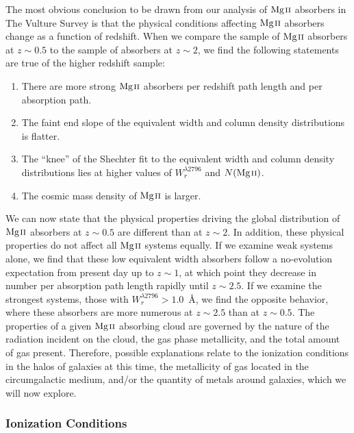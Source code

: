 The most obvious conclusion to be drawn from our analysis of ${\hbox{{\rm Mg}\kern 0.1em{\sc ii}}}$ absorbers in The Vulture Survey is that the physical conditions affecting ${\hbox{{\rm Mg}\kern 0.1em{\sc ii}}}$ absorbers change as a function of redshift. When we compare the sample of ${\hbox{{\rm Mg}\kern 0.1em{\sc ii}}}$ absorbers at $z \sim 0.5$ to the sample of absorbers at $z \sim 2$, we find the following statements are true of the higher redshift sample:

\begin{enumerate}
\item There are more strong ${\hbox{{\rm Mg}\kern 0.1em{\sc ii}}}$ absorbers per redshift path length and per absorption path.
\item The faint end slope of the equivalent width and column density distributions is flatter.
\item The ``knee'' of the Shechter fit to the equivalent width and column density distributions lies at higher values of $W_r^{\lambda2796}$ and $N(\hbox{{\rm Mg}\kern 0.1em{\sc ii}})$.
\item The cosmic mass density of ${\hbox{{\rm Mg}\kern 0.1em{\sc ii}}}$ is larger.
\end{enumerate}

\noindent We can now state that the physical properties driving the global distribution of ${\hbox{{\rm Mg}\kern 0.1em{\sc ii}}}$ absorbers at $z \sim 0.5$ are different than at $z \sim 2$. In addition, these physical properties do not affect all ${\hbox{{\rm Mg}\kern 0.1em{\sc ii}}}$ systems equally. If we examine weak systems alone, we find that these low equivalent width absorbers follow a no-evolution expectation from present day up to $z \sim 1$, at which point they decrease in number per absorption path length rapidly until $z \sim 2.5$. If we examine the strongest systems, those with $W_r^{\lambda2796} > 1.0$~{\AA}, we find the opposite behavior, where these absorbers are more numerous at $z \sim 2.5$ than at $z \sim 0.5$. The properties of a given ${\hbox{{\rm Mg}\kern 0.1em{\sc ii}}}$ absorbing cloud are governed by the nature of the radiation incident on the cloud, the gas phase metallicity, and the total amount of gas present. Therefore, possible explanations relate to the ionization conditions in the halos of galaxies at this time, the metallicity of gas located in the circumgalactic medium, and/or the quantity of metals around galaxies, which we will now explore.


\subsubsection{Ionization Conditions}
\label{ch5:ionization}

